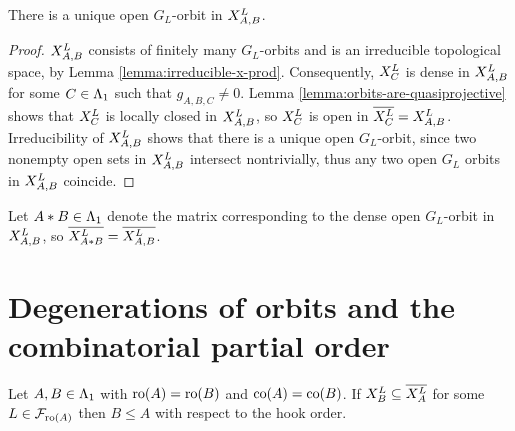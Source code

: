 \documentclass[a4paper, 11pt, twoside]{report}
\begin{document}
\begin{proposition}\label{prop:open-orbit-x-prod}
There is a unique open $G_L$-orbit in $\xprod[L]{A,B}$.
\end{proposition}

\begin{proof}
$\xprod[L]{A,B}$ consists of finitely many $G_L$-orbits and is an irreducible topological space, by Lemma \ref{lemma:irreducible-x-prod}. Consequently, $\xprod[L]{C}$ is dense in $\xprod[L]{A,B}$ for some $C\in\matrices$ such that $g_{A,B,C}\neq 0$. Lemma \ref{lemma:orbits-are-quasiprojective} shows that $\xprod[L]{C}$ is locally closed in $\xprod[L]{A,B}$, so $\xprod[L]{C}$ is open in $\overline{\xprod[L]{C}}=\xprod[L]{A,B}$. Irreducibility of $\xprod[L]{A,B}$ shows that there is a unique open $G_L$-orbit, since two nonempty open sets in $\xprod[L]{A,B}$ intersect nontrivially, thus any two open $G_L$ orbits in $\xprod[L]{A,B}$ coincide.
\end{proof}

Let $A\ast B\in\matrices$ denote the matrix corresponding to the dense open $G_L$-orbit in $\xprod[L]{A,B}$, so $\overline{\xprod[L]{A\ast B}}=\overline{\xprod[L]{A,B}}$.

\section{Degenerations of orbits and the combinatorial partial order}

\begin{proposition}\label{proposition:compare-partial-orders}
Let $A,B\in\matrices$ with $\ro{A}=\ro{B}$ and $\co{A}=\co{B}$. If $\xprod[L]{B}\subset\overline{\xprod[L]{A}}$ for some $L\in\flags_{\ro{A}}$ then $B\le A$ with respect to the hook order.
\end{proposition}
\end{document}
